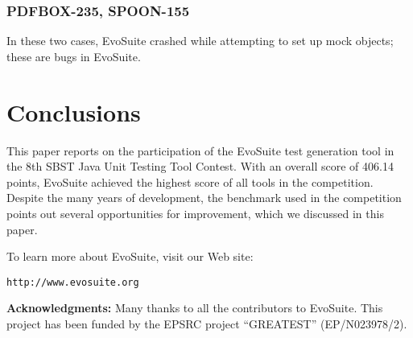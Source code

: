 \documentclass[sigconf]{acmart}
\newcommand{\EVOSUITE}{{\sc EvoSuite}\xspace}
\newcommand{\TOTALPOINTS}{{406.14}\xspace}
\begin{document}

\subsubsection*{PDFBOX-235, SPOON-155} In these two cases, \EVOSUITE crashed while attempting to set up mock objects; these are bugs in \EVOSUITE.


\section{Conclusions}

This paper reports on the participation of the \EVOSUITE test
generation tool in the 8th SBST Java Unit Testing Tool Contest. With
an overall score of \TOTALPOINTS points, \EVOSUITE achieved the
highest score of all tools in the competition. Despite the many years of development, the benchmark used in the competition points out several opportunities for improvement, which we discussed in this paper.

To learn more about \EVOSUITE, visit our Web site:
\begin{center}
\texttt{http://www.evosuite.org}
\end{center}

\textbf{Acknowledgments:} Many thanks to all the contributors to
\EVOSUITE.  This project has been funded by the EPSRC project
``GREATEST'' (EP/N023978/2).


\balance


\end{document}
